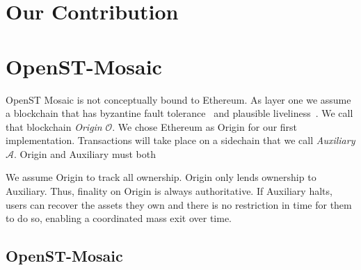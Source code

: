 \documentclass[12pt,a4paper]{article}
\newcommand{\A}{\mathcal{A}}
\newcommand{\OC}{\mathcal{O}}
\begin{document}
%
%
\section{Our Contribution}

%
%
\section{OpenST-Mosaic}
OpenST Mosaic is not conceptually bound to Ethereum.
As layer one we assume a blockchain that has byzantine fault tolerance~\cite{pbft} and plausible liveliness~\cite{casperffg}.
We call that blockchain \emph{Origin} $\OC$.
We chose Ethereum as Origin for our first implementation.
Transactions will take place on a sidechain that we call \emph{Auxiliary} $\A$.
Origin and Auxiliary must both %

We assume Origin to track all ownership.
Origin only lends ownership to Auxiliary.
Thus, finality on Origin is always authoritative.
If Auxiliary halts, users can recover the assets they own and there is no restriction in time for them to do so,
enabling a coordinated mass exit over time.

%
%
%
%


\subsection{OpenST-Mosaic}
\label{subsec:mosaic}





\end{document}

